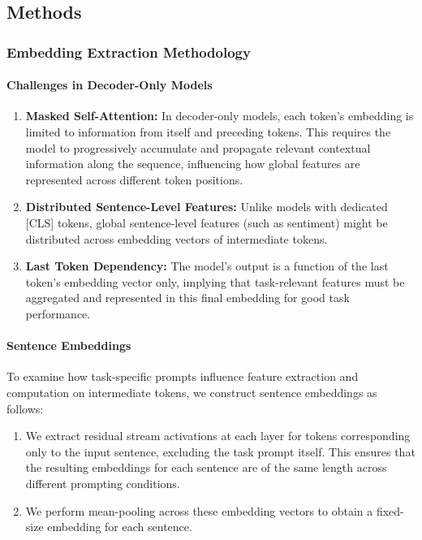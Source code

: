 \subsection{Methods}

\subsubsection{Embedding Extraction Methodology}
\label{appendix:embedding_extraction}


\paragraph{Challenges in Decoder-Only Models}

\begin{enumerate}
    \item \textbf{Masked Self-Attention:} In decoder-only models, each token's embedding is limited to information from itself and preceding tokens. This requires the model to progressively accumulate and propagate relevant contextual information along the sequence, influencing how global features are represented across different token positions.

    \item \textbf{Distributed Sentence-Level Features:} Unlike models with dedicated [CLS] tokens, global sentence-level features (such as sentiment) might be distributed across embedding vectors of intermediate tokens.

    \item \textbf{Last Token Dependency:} The model's output is a function of the last token's embedding vector only, implying that task-relevant features must be aggregated and represented in this final embedding for good task performance.

\end{enumerate}


\paragraph{Sentence Embeddings}
To examine how task-specific prompts influence feature extraction and computation on intermediate tokens, we construct sentence embeddings as follows:

\begin{enumerate}
    \item We extract residual stream activations at each layer for tokens corresponding only to the input sentence, excluding the task prompt itself. This ensures that the resulting embeddings for each sentence are of the same length across different prompting conditions.

    \item We perform mean-pooling across these embedding vectors to obtain a fixed-size embedding for each sentence.
\end{enumerate}

